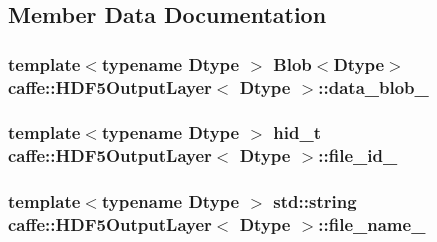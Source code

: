 \subsection{Member Data Documentation}
\hypertarget{classcaffe_1_1_h_d_f5_output_layer_ad91a29d84d4f7c577adf1b634fec1d92}{
\subsubsection[{data\+\_\+blob\+\_\+}]{\setlength{\rightskip}{0pt plus 5cm}template$<$typename Dtype $>$ {\bf Blob}$<$Dtype$>$ {\bf caffe\+::\+H\+D\+F5\+Output\+Layer}$<$ Dtype $>$\+::data\+\_\+blob\+\_\+\hspace{0.3cm}{\ttfamily [protected]}}}\label{classcaffe_1_1_h_d_f5_output_layer_ad91a29d84d4f7c577adf1b634fec1d92}
\hypertarget{classcaffe_1_1_h_d_f5_output_layer_a353a5e36b3baa08e381dc5da1bb8b74e}{
\subsubsection[{file\+\_\+id\+\_\+}]{\setlength{\rightskip}{0pt plus 5cm}template$<$typename Dtype $>$ hid\+\_\+t {\bf caffe\+::\+H\+D\+F5\+Output\+Layer}$<$ Dtype $>$\+::file\+\_\+id\+\_\+\hspace{0.3cm}{\ttfamily [protected]}}}\label{classcaffe_1_1_h_d_f5_output_layer_a353a5e36b3baa08e381dc5da1bb8b74e}
\hypertarget{classcaffe_1_1_h_d_f5_output_layer_aa4609affd7a57ba7481b98afed3f7985}{
\subsubsection[{file\+\_\+name\+\_\+}]{\setlength{\rightskip}{0pt plus 5cm}template$<$typename Dtype $>$ std\+::string {\bf caffe\+::\+H\+D\+F5\+Output\+Layer}$<$ Dtype $>$\+::file\+\_\+name\+\_\+\hspace{0.3cm}{\ttfamily [protected]}}}\label{classcaffe_1_1_h_d_f5_output_layer_aa4609affd7a57ba7481b98afed3f7985}
